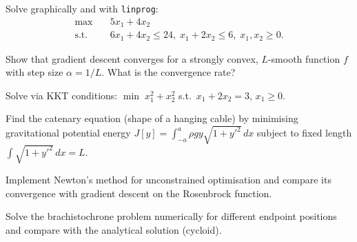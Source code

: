 \begin{exercise}
Solve graphically and with \texttt{linprog}:
\begin{align*}
  \max\quad & 5x_1 + 4x_2 \\
  \text{s.t.}\quad & 6x_1+4x_2\leq 24,\; x_1+2x_2\leq 6,\;
  x_1,x_2\geq 0.
\end{align*}
\end{exercise}

\begin{exercise}
Show that gradient descent converges for a strongly convex,
$L$-smooth function $f$ with step size $\alpha=1/L$.  What is the
convergence rate?
\end{exercise}

\begin{exercise}
Solve via KKT conditions:
$\min\;x_1^2+x_2^2$ s.t.\ $x_1+2x_2=3$, $x_1\geq 0$.
\end{exercise}

\begin{exercise}
Find the catenary equation (shape of a hanging cable) by minimising
gravitational potential energy
$J[y]=\int_{-a}^{a}\rho g y\sqrt{1+y'^2}\,dx$ subject to fixed
length $\int\sqrt{1+y'^2}\,dx=L$.
\end{exercise}

\begin{exercise}
Implement Newton's method for unconstrained optimisation and compare
its convergence with gradient descent on the Rosenbrock function.
\end{exercise}

\begin{exercise}
Solve the brachistochrone problem numerically for different endpoint
positions and compare with the analytical solution (cycloid).
\end{exercise}

